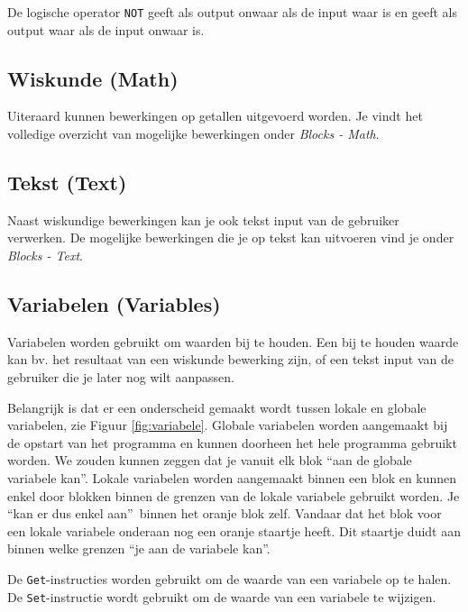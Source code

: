 De logische operator \texttt{NOT} geeft als output onwaar als de input waar is en geeft als output waar als de input onwaar is.

\subsection{Wiskunde (Math)}
Uiteraard kunnen bewerkingen op getallen uitgevoerd worden. Je vindt het volledige overzicht van mogelijke bewerkingen onder \emph{Blocks - Math}.

\subsection{Tekst (Text)}
Naast wiskundige bewerkingen kan je ook tekst input van de gebruiker verwerken. De mogelijke bewerkingen die je op tekst kan uitvoeren vind je onder \emph{Blocks - Text}.

\subsection{Variabelen (Variables)}
Variabelen worden gebruikt om waarden bij te houden. Een bij te houden waarde kan bv. het resultaat van een wiskunde bewerking zijn, of een tekst input van de gebruiker die je later nog wilt aanpassen. 

Belangrijk is dat er een onderscheid gemaakt wordt tussen lokale en globale variabelen, zie Figuur \ref{fig:variabele}. Globale variabelen worden aangemaakt bij de opstart van het programma en kunnen doorheen het hele programma gebruikt worden. We zouden kunnen zeggen dat je vanuit elk blok \textquotedblleft aan de globale variabele kan\textquotedblright.
Lokale variabelen worden aangemaakt binnen een blok en kunnen enkel door blokken binnen de grenzen van de lokale variabele gebruikt worden. Je \textquotedblleft kan er dus enkel aan\textquotedblright \ binnen het oranje blok zelf. Vandaar dat het blok voor een lokale variabele onderaan nog een oranje staartje heeft. Dit staartje duidt aan binnen welke grenzen \textquotedblleft je aan de variabele kan\textquotedblright.


De \texttt{Get}-instructies worden gebruikt om de waarde van een variabele op te halen. De \texttt{Set}-instructie wordt gebruikt om de waarde van een variabele te wijzigen.

